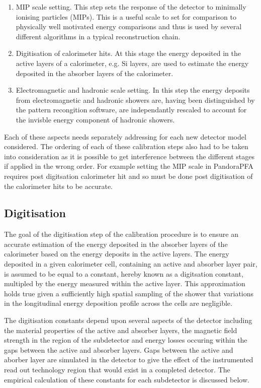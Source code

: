\begin{enumerate}
\item MIP scale setting.  This step sets the response of the detector to minimally ionising particles (MIPs).  This is a useful scale to set for comparison to physically well motivated energy comparisons and thus is used by several different algorithms in a typical reconstruction chain. 
\item Digitisation of calorimeter hits.  At this stage the energy deposited in the active layers of a calorimeter, e.g. Si layers, are used to estimate the energy deposited in the absorber layers of the calorimeter.  
\item Electromagnetic and hadronic scale setting.  In this step the energy deposits from electromagnetic and hadronic showers are, having been distinguished by the pattern recongition software, are independantly rescaled to account for the invisble energy component of hadronic showers.  
\end{enumerate}

Each of these aspects needs separately addressing for each new detector model considered.  The ordering of each of these calibration steps also had to be taken into consideration as it is possible to get interference between the different stages if applied in the wrong order.  For example setting the MIP scale in PandoraPFA requires post digitsation calorimeter hit and so must be done post digitisation of the calorimeter hits to be accurate.

\subsection{Digitisation}
The goal of the digitisation step of the calibration procedure is to ensure an accurate estimation of the energy deposited in the absorber layers of the calorimeter based on the energy deposits in the active layers.  The energy deposited in a given calorimeter cell, containing an active and absorber layer pair, is assumed to be equal to a constant, hereby known as a digitsation constant, multipled by the energy measured within the active layer.  This approximation holds true given a sufficiently high spatial sampling of the shower that variations in the longitudinal energy deposition profile across the cells are negligible.  

The digitisation constants depend upon several aspects of the detector including the material properties of the active and absorber layers, the magnetic field strength in the region of the subdetector and energy losses occuring within the gaps between the active and absorber layers.  Gaps between the active and aborber layer are simulated in the detector to give the effect of the instrumented read out technology region that would exist in a completed detector.  The empirical calculation of these constants for each subdetector is discussed below. 


